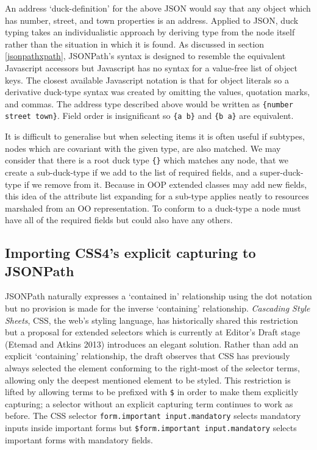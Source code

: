 \documentclass[12pt, ]{article}
\begin{document}
An address `duck-definition' for the above JSON would say that any
object which has number, street, and town properties is an address.
Applied to JSON, duck typing takes an individualistic approach by
deriving type from the node itself rather than the situation in which it
is found. As discussed in section \ref{jsonpathxpath}, JSONPath's syntax
is designed to resemble the equivalent Javascript accessors but
Javascript has no syntax for a value-free list of object keys. The
closest available Javascript notation is that for object literals so a
derivative duck-type syntax was created by omitting the values,
quotation marks, and commas. The address type described above would be
written as \texttt{\{number street town\}}. Field order is insignificant
so \texttt{\{a b\}} and \texttt{\{b a\}} are equivalent.

It is difficult to generalise but when selecting items it is often
useful if subtypes, nodes which are covariant with the given type, are
also matched. We may consider that there is a root duck type
\texttt{\{\}} which matches any node, that we create a sub-duck-type if
we add to the list of required fields, and a super-duck-type if we
remove from it. Because in OOP extended classes may add new fields, this
idea of the attribute list expanding for a sub-type applies neatly to
resources marshaled from an OO representation. To conform to a duck-type
a node must have all of the required fields but could also have any
others.

\subsection{Importing CSS4's explicit capturing to
JSONPath}\label{importing-css4s-explicit-capturing-to-jsonpath}

JSONPath naturally expresses a `contained in' relationship using the dot
notation but no provision is made for the inverse `containing'
relationship. \emph{Cascading Style Sheets}, CSS, the web's styling
language, has historically shared this restriction but a proposal for
extended selectors which is currently at Editor's Draft stage (Etemad
and Atkins 2013) introduces an elegant solution. Rather than add an
explicit `containing' relationship, the draft observes that CSS has
previously always selected the element conforming to the right-most of
the selector terms, allowing only the deepest mentioned element to be
styled. This restriction is lifted by allowing terms to be prefixed with
\texttt{\$} in order to make them explicitly capturing; a selector
without an explicit capturing term continues to work as before. The CSS
selector \texttt{form.important input.mandatory} selects mandatory
inputs inside important forms but
\texttt{\$form.important input.mandatory} selects important forms with
mandatory fields.
\end{document}
